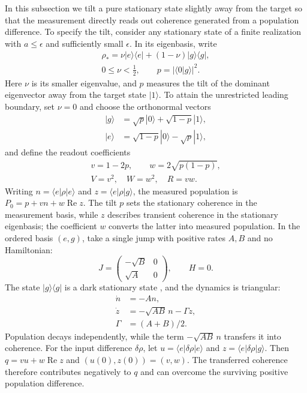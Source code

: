 \documentclass[aps,pra,reprint,amsmath,amssymb,nofootinbib,floatfix,longbibliography]{revtex4-2}
\theoremstyle{aps}
\newcommand{\eps}{\epsilon}
\newcommand{\ket}[1]{|#1\rangle}
\newcommand{\bra}[1]{\langle#1|}
\newcommand{\proj}[1]{|#1\rangle\langle#1|}
\begin{document}
In this subsection we tilt a pure stationary state slightly away from the target so that the measurement directly reads out coherence generated from a population difference. To specify the tilt, consider any stationary state of a finite realization with $a\le\eps$ and sufficiently small $\eps$. In its eigenbasis, write
\begin{equation}\label{eq:stationary}
 \begin{gathered}
 \rho_*=\nu\proj e+(1-\nu)\proj g,\\
 0\le\nu<\tfrac12,\qquad p=|\langle0|g\rangle|^2.
 \end{gathered}
\end{equation}
Here $\nu$ is its smaller eigenvalue, and $p$ measures the tilt of the dominant eigenvector away from the target state $\ket1$. To attain the unrestricted leading boundary, set $\nu=0$ and choose the orthonormal vectors
\begin{equation}\label{eq:familybasis}
 \begin{aligned}
 \ket g&=\sqrt p\ket0+\sqrt{1-p}\ket1,\\
 \ket e&=\sqrt{1-p}\ket0-\sqrt p\ket1,
 \end{aligned}
\end{equation}
and define the readout coefficients
\begin{equation}\label{eq:vw}
 \begin{gathered}
 v=1-2p,\qquad w=2\sqrt{p(1-p)},\\
 V=v^2,\quad W=w^2,\quad R=vw.
 \end{gathered}
\end{equation}
Writing $n=\bra e\rho\ket e$ and $z=\bra e\rho\ket g$, the measured population is $P_0=p+vn+w\operatorname{Re}z$. The tilt $p$ sets the stationary coherence in the measurement basis, while $z$ describes transient coherence in the stationary eigenbasis; the coefficient $w$ converts the latter into measured population. In the ordered basis $(e,g)$, take a single jump with positive rates $A,B$ and no Hamiltonian:
\begin{equation}\label{eq:familyjump}
 J=\begin{pmatrix}-\sqrt B&0\\\sqrt A&0\end{pmatrix},\qquad H=0.
\end{equation}
The state $\proj g$ is a dark stationary state \cite{Kraus2008}, and the dynamics is triangular:
\begin{equation}\label{eq:triangular}
 \begin{aligned}
 \dot n&=-An,\\
 \dot z&=-\sqrt{AB}\,n-\Gamma z,\\
 \Gamma&=(A+B)/2.
 \end{aligned}
\end{equation}
Population decays independently, while the term $-\sqrt{AB}\,n$ transfers it into coherence. For the input difference $\delta\rho$, let $u=\bra e\delta\rho\ket e$ and $z=\bra e\delta\rho\ket g$. Then $q=vu+w\operatorname{Re}z$ and $(u(0),z(0))=(v,w)$. The transferred coherence therefore contributes negatively to $q$ and can overcome the surviving positive population difference.
\end{document}
